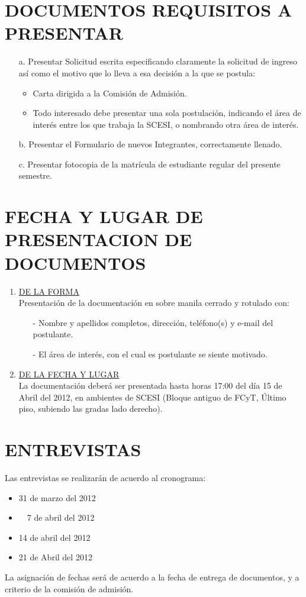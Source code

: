 \documentclass[11pt,letterpaper]{report}
\begin{document}
\section*{\bf \normalsize DOCUMENTOS REQUISITOS A PRESENTAR}
\begin{itemize}
\item[a.] Presentar Solicitud escrita especificando claramente la solicitud de ingreso así como el motivo que lo lleva a esa decisión a la que se postula:
\begin{itemize}
\item Carta dirigida a la Comisión de Admisión.
\item Todo interesado debe presentar una sola postulación, indicando el área de interés entre los que  trabaja la SCESI, o nombrando otra área de interés.
\end{itemize}
\item[b.] Presentar el Formulario de nuevos Integrantes, correctamente llenado.
\item[c.] Presentar fotocopia de la matrícula de estudiante regular del presente semestre.
\end{itemize}
\section*{\bf \normalsize FECHA Y LUGAR DE PRESENTACION DE DOCUMENTOS}
\begin{enumerate}
\item \underline{DE LA FORMA}\\
Presentación de la documentación en sobre manila cerrado y rotulado con:
\begin{itemize}
\item[-] Nombre y apellidos completos, dirección, teléfono(s) y e-mail del postulante.
\item[-] El área de interés, con el cual es postulante se siente motivado.
\end{itemize}
\item \underline{DE LA FECHA Y LUGAR}\\
La documentación deberá ser presentada hasta horas 17:00 del día 15 de Abril del 2012, en ambientes de SCESI (Bloque antiguo de FCyT, Último piso, subiendo las gradas lado derecho).
\end{enumerate}
\section*{\bf \normalsize ENTREVISTAS}
Las entrevistas se realizarán de acuerdo al cronograma:
\begin{itemize}
\item 31 de marzo del 2012
\item ~~7 de abril del 2012
\item 14 de abril del 2012
\item 21 de Abril del 2012
\end{itemize}
La asignación de fechas será de acuerdo a la fecha de entrega de documentos, y a criterio de la comisión de admisión.
\end{document}
